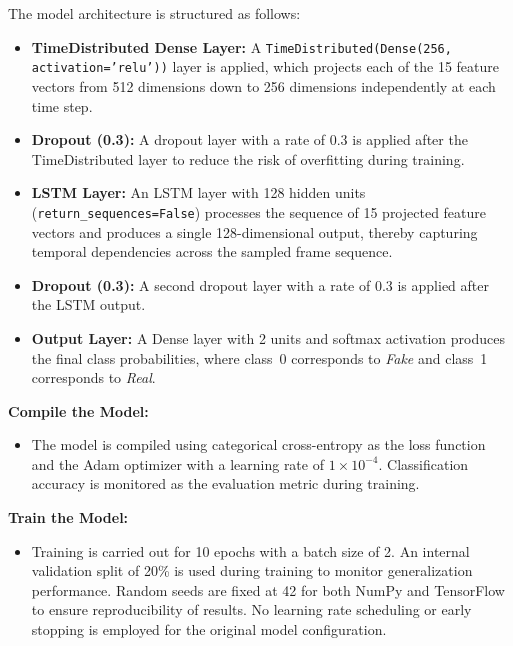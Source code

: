     The model architecture is structured as follows:
    \begin{itemize}
        \item \textbf{TimeDistributed Dense Layer:} A \texttt{TimeDistributed(Dense(256, activation='relu'))} layer is applied, which projects each of the 15 feature vectors from 512 dimensions down to 256 dimensions independently at each time step.
        \item \textbf{Dropout (0.3):} A dropout layer with a rate of 0.3 is applied after the TimeDistributed layer to reduce the risk of overfitting during training.
        \item \textbf{LSTM Layer:} An LSTM layer with 128 hidden units (\texttt{return\_sequences=False}) processes the sequence of 15 projected feature vectors and produces a single 128-dimensional output, thereby capturing temporal dependencies across the sampled frame sequence.
        \item \textbf{Dropout (0.3):} A second dropout layer with a rate of 0.3 is applied after the LSTM output.
        \item \textbf{Output Layer:} A Dense layer with 2 units and softmax activation produces the final class probabilities, where class~0 corresponds to \textit{Fake} and class~1 corresponds to \textit{Real}.
    \end{itemize}

    \item \textbf{Compile the Model:}
    \begin{itemize}
        \item The model is compiled using categorical cross-entropy as the loss function and the Adam optimizer with a learning rate of $1 \times 10^{-4}$. Classification accuracy is monitored as the evaluation metric during training.
    \end{itemize}

    \item \textbf{Train the Model:}
    \begin{itemize}
        \item Training is carried out for 10 epochs with a batch size of 2. An internal validation split of 20\% is used during training to monitor generalization performance. Random seeds are fixed at 42 for both NumPy and TensorFlow to ensure reproducibility of results. No learning rate scheduling or early stopping is employed for the original model configuration.
    \end{itemize}



